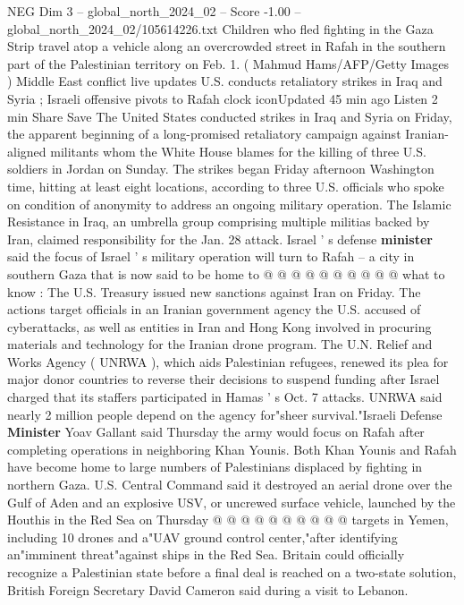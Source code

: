 \begin{textsample}{NEG Dim 3 – global\_north\_2024\_02 – Score -1.00 – global\_north\_2024\_02/105614226.txt}  \label{ex:f3_neg_208}
Children who fled fighting in the Gaza Strip travel atop a vehicle along an overcrowded street in Rafah in the southern part of the Palestinian territory on Feb. 1. ( Mahmud Hams/AFP/Getty Images ) Middle East conflict live updates U.S. conducts retaliatory strikes in Iraq and Syria ; Israeli offensive pivots to Rafah clock iconUpdated 45 min ago Listen 2 min Share Save The United States conducted strikes in Iraq and Syria on Friday, the apparent beginning of a long-promised retaliatory campaign against Iranian-aligned militants whom the White House blames for the killing of three U.S. soldiers in Jordan on Sunday.
The strikes began Friday afternoon Washington time, hitting at least eight locations, according to three U.S. officials who spoke on condition of anonymity to address an ongoing military operation.
The Islamic Resistance in Iraq, an umbrella group comprising multiple militias backed by Iran, claimed responsibility for the Jan. 28 attack.
Israel ' s defense \textbf{minister} said the focus of Israel ' s military operation will turn to Rafah -- a city in southern Gaza that is now said to be home to @ @ @ @ @ @ @ @ @ @ what to know : The U.S.
Treasury issued new sanctions against Iran on Friday.
The actions target officials in an Iranian government agency the U.S. accused of cyberattacks, as well as entities in Iran and Hong Kong involved in procuring materials and technology for the Iranian drone program.
The U.N.
Relief and Works Agency ( UNRWA ), which aids Palestinian refugees, renewed its plea for major donor countries to reverse their decisions to suspend funding after Israel charged that its staffers participated in Hamas ' s Oct. 7 attacks.
UNRWA said nearly 2 million people depend on the agency for"sheer survival."Israeli Defense \textbf{Minister} Yoav Gallant said Thursday the army would focus on Rafah after completing operations in neighboring Khan Younis.
Both Khan Younis and Rafah have become home to large numbers of Palestinians displaced by fighting in northern Gaza.
U.S.
Central Command said it destroyed an aerial drone over the Gulf of Aden and an explosive USV, or uncrewed surface vehicle, launched by the Houthis in the Red Sea on Thursday @ @ @ @ @ @ @ @ @ @ targets in Yemen, including 10 drones and a"UAV ground control center,"after identifying an"imminent threat"against ships in the Red Sea.
Britain could officially recognize a Palestinian state before a final deal is reached on a two-state solution, British Foreign Secretary David Cameron said during a visit to Lebanon.

\end{textsample}
